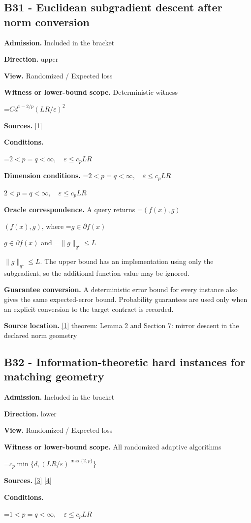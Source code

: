 \documentclass[10pt,a4paper]{article}
\newcommand{\AtlasMath}[1]{\par\begingroup\centering\setbox0=\hbox{$\displaystyle #1$}\ifdim\wd0>1.4\linewidth\typeout{ATLAS WIDE FORMULA: \the\wd0}\fi\ifdim\wd0>\linewidth\resizebox{\linewidth}{!}{\box0}\else\box0\fi\par\endgroup}
\newcommand{\AtlasInlineMath}[1]{\begingroup\setbox0=\hbox{$#1$}\ifdim\wd0>.4\linewidth\endgroup\AtlasMath{#1}\else\endgroup$#1$\fi}
\begin{document}
\subsection{B31 - Euclidean subgradient descent after norm conversion}
\textbf{Admission.} Included in the bracket

\textbf{Direction.} upper

\textbf{View.} Randomized / Expected loss

\textbf{Witness or lower-bound scope.} Deterministic witness

\AtlasMath{C d^{1-2/p}(LR/\varepsilon)^2}
\textbf{Sources.} \href{https://arxiv.org/pdf/1107.4080}{[1]}

\textbf{Conditions.} 
\AtlasMath{2<p=q<\infty,\quad\varepsilon\le c_pLR}


\textbf{Dimension conditions.} \AtlasInlineMath{2<p=q<\infty,\quad\varepsilon\le c_pLR}

\textbf{Oracle correspondence.} A query returns \AtlasInlineMath{(f(x),g)}, where \AtlasInlineMath{g\in\partial f(x)} and \AtlasInlineMath{\|g\|_{q^\star}\le L}. The upper bound has an implementation using only the subgradient, so the additional function value may be ignored.

\textbf{Guarantee conversion.} A deterministic error bound for every instance also gives the same expected-error bound. Probability guarantees are used only when an explicit conversion to the target contract is recorded.

\textbf{Source location.} \href{https://arxiv.org/pdf/1107.4080}{[1]} theorem: Lemma 2 and Section 7: mirror descent in the declared norm geometry

\subsection{B32 - Information-theoretic hard instances for matching geometry}
\textbf{Admission.} Included in the bracket

\textbf{Direction.} lower

\textbf{View.} Randomized / Expected loss

\textbf{Witness or lower-bound scope.} All randomized adaptive algorithms

\AtlasMath{c_p\min\{d,(LR/\varepsilon)^{\max\{2,p\}}\}}
\textbf{Sources.} \href{https://arxiv.org/pdf/2609.20701}{[3]} \href{https://arxiv.org/pdf/2609.20687}{[4]}

\textbf{Conditions.} 
\AtlasMath{1<p=q<\infty,\quad\varepsilon\le c_p LR}
\end{document}
